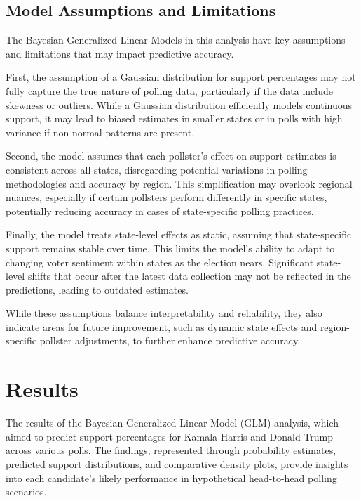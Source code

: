 \documentclass[
  letterpaper,
  DIV=11,
  numbers=noendperiod]{scrartcl}
\begin{document}
\subsection{Model Assumptions and
Limitations}\label{model-assumptions-and-limitations}

The Bayesian Generalized Linear Models in this analysis have key
assumptions and limitations that may impact predictive accuracy.

First, the assumption of a Gaussian distribution for support percentages
may not fully capture the true nature of polling data, particularly if
the data include skewness or outliers. While a Gaussian distribution
efficiently models continuous support, it may lead to biased estimates
in smaller states or in polls with high variance if non-normal patterns
are present.

Second, the model assumes that each pollster's effect on support
estimates is consistent across all states, disregarding potential
variations in polling methodologies and accuracy by region. This
simplification may overlook regional nuances, especially if certain
pollsters perform differently in specific states, potentially reducing
accuracy in cases of state-specific polling practices.

Finally, the model treats state-level effects as static, assuming that
state-specific support remains stable over time. This limits the model's
ability to adapt to changing voter sentiment within states as the
election nears. Significant state-level shifts that occur after the
latest data collection may not be reflected in the predictions, leading
to outdated estimates.

While these assumptions balance interpretability and reliability, they
also indicate areas for future improvement, such as dynamic state
effects and region-specific pollster adjustments, to further enhance
predictive accuracy.

\section{Results}\label{results}

The results of the Bayesian Generalized Linear Model (GLM) analysis,
which aimed to predict support percentages for Kamala Harris and Donald
Trump across various polls. The findings, represented through
probability estimates, predicted support distributions, and comparative
density plots, provide insights into each candidate's likely performance
in hypothetical head-to-head polling scenarios.
\end{document}
